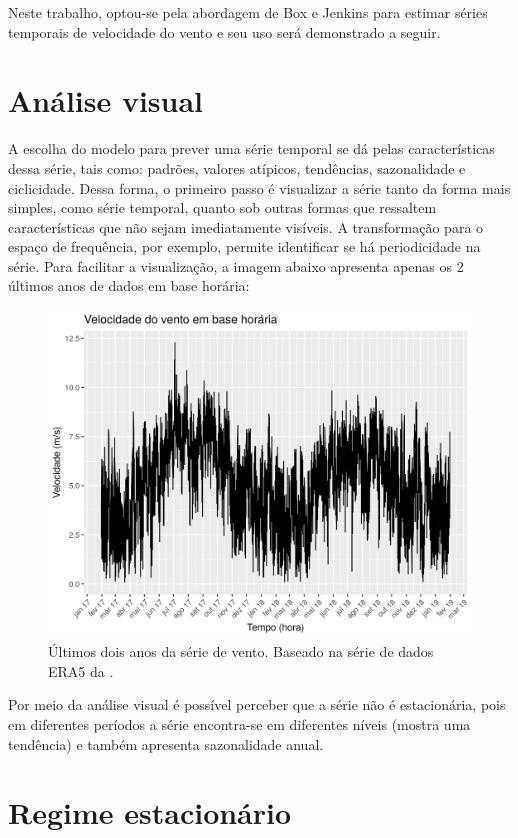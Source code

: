 \documentclass[
	12pt,				%
	openright,			%
	oneside,			%
	a4paper,			%
	english,			%
	french,				%
	spanish,			%
	brazil				%
	]{abntex2}
\begin{document}
Neste trabalho, optou-se pela abordagem de Box e Jenkins para estimar séries temporais de velocidade do vento e seu uso será demonstrado a seguir.

\section{Análise visual}

A escolha do modelo para prever uma série temporal se dá pelas características dessa série, tais como: padrões, valores atípicos, tendências, sazonalidade e ciclicidade. Dessa forma, o primeiro passo é visualizar a série tanto da forma mais simples, como série temporal, quanto sob outras formas que ressaltem características que não sejam imediatamente visíveis. A transformação para o espaço de frequência, por exemplo, permite identificar se há periodicidade na série. Para facilitar a visualização, a imagem abaixo apresenta apenas os 2 últimos anos de dados em base horária:

\begin{figure}[h]
    \centering
	\includegraphics[width=\textwidth]{entire_series_hourly_basis}
	\caption{Últimos dois anos da série de vento. Baseado na série de dados ERA5 da \cite{era5}.}
\end{figure}
\FloatBarrier

Por meio da análise visual é possível perceber que a série não é estacionária, pois em diferentes períodos a série encontra-se em diferentes níveis (mostra uma tendência) e também apresenta sazonalidade anual.

\section{Regime estacionário}
\end{document}
